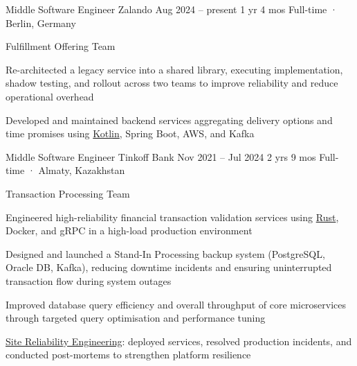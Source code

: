 \documentclass[11pt, a4paper]{style}
\begin{document}
\setcolumnwidth{5.5cm,2.6cm}
\begin{paracol}{2}



    \cvEntry
        {Middle Software Engineer} {Zalando}
        {Aug 2024 -- present} {1 yr 4 mos}
        {Full-time · Berlin, Germany}
        {
            Fulfillment Offering Team \\
            \vspace{-5mm}
            \begin{cvItems}
                \item Re-architected a legacy service into a shared library, executing implementation, shadow testing, and rollout across two teams to improve reliability and reduce operational overhead
                \item Developed and maintained backend services aggregating delivery options and time promises using \underline{Kotlin}, Spring Boot, AWS, and Kafka
            \end{cvItems}
        }

    \cvEntry
        {Middle Software Engineer} {Tinkoff Bank}
        {Nov 2021 -- Jul 2024} {2 yrs 9 mos}
        {Full-time · Almaty, Kazakhstan}
        {
            Transaction Processing Team \\
            \vspace{-5mm}
            \begin{cvItems}
                \item Engineered high-reliability financial transaction validation services using \underline{Rust}, Docker, and gRPC in a high-load production environment
                \item Designed and launched a Stand-In Processing backup system (PostgreSQL, Oracle DB, Kafka), reducing downtime incidents and ensuring uninterrupted transaction flow during system outages
                \item Improved database query efficiency and overall throughput of core microservices through targeted query optimisation and performance tuning
                \item \underline{Site Reliability Engineering}: deployed services, resolved production incidents, and conducted post-mortems to strengthen platform resilience
            \end{cvItems}
        }


\end{paracol}
\end{document}
